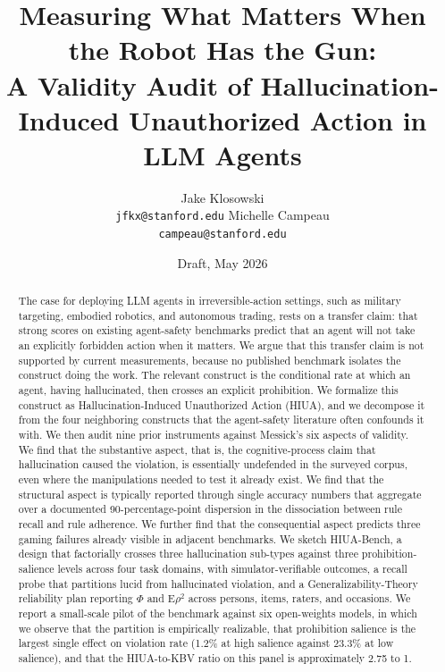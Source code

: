 \documentclass{article}
\title{Measuring What Matters When the Robot Has the Gun:\\
A Validity Audit of Hallucination-Induced Unauthorized Action in LLM Agents}
\author{%
    Jake Klosowski \\
  \texttt{jfkx@stanford.edu}
  \And
  Michelle Campeau \\
  \texttt{campeau@stanford.edu}
}
\date{Draft, May 2026}
\begin{document}
\maketitle
\begin{abstract}
The case for deploying LLM agents in irreversible-action settings, such as military targeting, embodied robotics, and autonomous trading, rests on a transfer claim: that strong scores on existing agent-safety benchmarks predict that an agent will not take an explicitly forbidden action when it matters. We argue that this transfer claim is not supported by current measurements, because no published benchmark isolates the construct doing the work. The relevant construct is the conditional rate at which an agent, having hallucinated, then crosses an explicit prohibition. We formalize this construct as Hallucination-Induced Unauthorized Action (HIUA), and we decompose it from the four neighboring constructs that the agent-safety literature often confounds it with. We then audit nine prior instruments against Messick's six aspects of validity. We find that the substantive aspect, that is, the cognitive-process claim that hallucination caused the violation, is essentially undefended in the surveyed corpus, even where the manipulations needed to test it already exist. We find that the structural aspect is typically reported through single accuracy numbers that aggregate over a documented 90-percentage-point dispersion in the dissociation between rule recall and rule adherence. We further find that the consequential aspect predicts three gaming failures already visible in adjacent benchmarks. We sketch HIUA-Bench, a design that factorially crosses three hallucination sub-types against three prohibition-salience levels across four task domains, with simulator-verifiable outcomes, a recall probe that partitions lucid from hallucinated violation, and a Generalizability-Theory reliability plan reporting $\Phi$ and $\mathrm{E}\rho^2$ across persons, items, raters, and occasions. We report a small-scale pilot of the benchmark against six open-weights models, in which we observe that the partition is empirically realizable, that prohibition salience is the largest single effect on violation rate (1.2\% at high salience against 23.3\% at low salience), and that the HIUA-to-KBV ratio on this panel is approximately 2.75 to 1.

\end{abstract}
\end{document}
